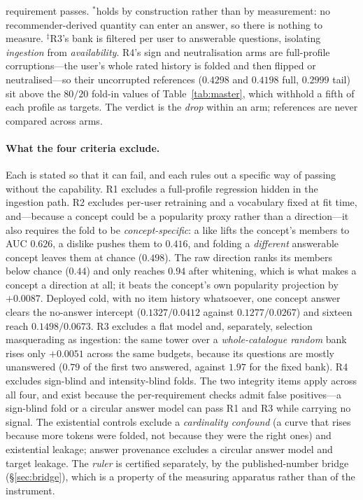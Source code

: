 \documentclass[11pt]{article}
\begin{document}
\begin{table}[t]
{requirement passes. $^{*}$holds by construction rather than by measurement: no recommender-derived
quantity can enter an answer, so there is nothing to measure. $^\ddagger$R3's bank is filtered per user to
answerable questions, isolating \emph{ingestion} from \emph{availability}. R4's sign and neutralisation arms
are full-profile corruptions---the user's whole rated history is folded and then flipped or
neutralised---so their uncorrupted references ($0.4298$ and $0.4198$ full, $0.2999$ tail) sit above the
$80/20$ fold-in values of Table~\ref{tab:master}, which withhold a fifth of each profile as targets. The
verdict is the \emph{drop} within an arm; references are never compared across arms.}
\label{tab:batteryresults}
\end{table}

\paragraph{What the four criteria exclude.} Each is stated so that it can fail, and each rules out a
specific way of passing without the capability. R1 excludes a full-profile regression hidden in the
ingestion path. R2 excludes per-user retraining and a vocabulary fixed at fit time, and---because a concept
could be a popularity proxy rather than a direction---it also requires the fold to be
\emph{concept-specific}: a like lifts the concept's members to AUC $0.626$, a dislike pushes them to
$0.416$, and folding a \emph{different} answerable concept leaves them at chance ($0.498$). The raw
direction ranks its members below chance ($0.44$) and only reaches $0.94$ after whitening, which is what
makes a concept a direction at all; it beats the concept's own popularity projection by $+0.0087$.
Deployed cold, with no item history whatsoever, one concept answer clears the no-answer intercept
($0.1327/0.0412$ against $0.1277/0.0267$) and sixteen reach $0.1498/0.0673$. R3 excludes a flat model and,
separately, selection masquerading as ingestion: the same tower over a \emph{whole-catalogue random} bank
rises only $+0.0051$ across the same budgets, because its questions are mostly unanswered ($0.79$ of the
first two answered, against $1.97$ for the fixed bank). R4 excludes sign-blind and intensity-blind folds.
The two integrity items apply across all four, and exist because the per-requirement checks admit false
positives---a sign-blind fold or a circular answer model can pass R1 and R3 while carrying no signal. The
existential controls exclude a \emph{cardinality confound} (a curve that rises because more tokens were
folded, not because they were the right ones) and existential leakage; answer provenance excludes a
circular answer model and target leakage. The
\emph{ruler} is certified separately, by the published-number bridge (\S\ref{sec:bridge}), which is a
property of the measuring apparatus rather than of the instrument.
\end{document}
